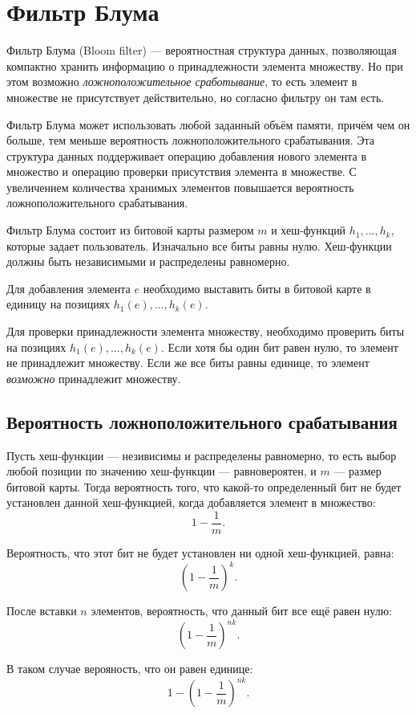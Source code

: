 \section{Фильтр Блума}
\label{sec:bloom-filter}
Фильтр Блума (Bloom filter) — вероятностная структура данных, позволяющая компактно хранить информацию о принадлежности элемента множеству. Но при этом возможно \emph{ложноположительное сработывание}, то есть элемент в множестве не присутствует действительно, но согласно фильтру он там есть.

Фильтр Блума может использовать любой заданный объём памяти, причём чем он больше, тем меньше вероятность ложноположительного срабатывания. Эта структура данных поддерживает операцию добавления нового элемента в множество и операцию проверки присутствия элемента в множестве. С увеличением количества хранимых элементов повышается вероятность ложноположительного срабатывания.

Фильтр Блума состоит из битовой карты размером $m$ и хеш-функций $h_1,...,h_k$, которые задает пользователь. Изначально все биты равны нулю. Хеш-функции должны быть независимыми и распределены равномерно.

Для добавления элемента $e$ необходимо выставить биты в битовой карте в единицу на позициях $h_1(e),...,h_k(e)$.

Для проверки принадлежности элемента множеству, необходимо проверить биты на позициях $h_1(e),...,h_k(e)$. Если хотя бы один бит равен нулю, то элемент не принадлежит множеству. Если же все биты равны единице, то элемент \emph{возможно} принадлежит множеству.

\subsection{Вероятность ложноположительного срабатывания}
Пусть хеш-функции — незивисимы и распределены равномерно, то есть выбор любой позиции по значению хеш-функции — равновероятен, и $m$ — размер битовой карты. Тогда вероятность того, что какой-то определенный бит не будет установлен данной хеш-функцией, когда добавляется элемент в множество:
\[
1 - \frac{1}{m}.
\]

Вероятность, что этот бит не будет установлен ни одной хеш-функцией, равна:
\[
\left( 1 - \frac{1}{m} \right)^k.
\]

После вставки $n$ элементов, вероятность, что данный бит все ещё равен нулю:
\[
\left( 1 - \frac{1}{m} \right)^{nk}.
\]

В таком случае верояность, что он равен единице:
\[
1 - \left( 1 - \frac{1}{m} \right)^{nk}.
\]

